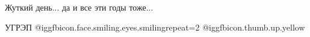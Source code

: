  
 
 
 
 

Жуткий день... да и все эти годы тоже...

УГРЭП @igg{fbicon.face.smiling.eyes.smiling}{repeat=2}  @igg{fbicon.thumb.up.yellow} 
